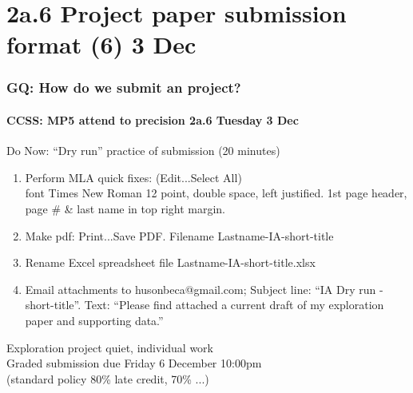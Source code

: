 \documentclass{beamer}
\begin{document}
\section{2a.6 Project paper submission format (6) 3 Dec}
\frame
{
  \frametitle{GQ: How do we submit an project?}
  \framesubtitle{CCSS: MP5 attend to precision \hfill \alert{2a.6 Tuesday 3 Dec}}
  \begin{block}{Do Now: ``Dry run'' practice of submission (20 minutes)}
    \begin{enumerate}
      \item Perform MLA quick fixes: (Edit...Select All) \\font Times New Roman 12 point, double space, left justified. 1st page header, page \# \& last name in top right margin.
      \item Make pdf: Print...Save PDF. Filename Lastname-IA-short-title
      \item Rename Excel spreadsheet file Lastname-IA-short-title.xlsx
      \item Email attachments to husonbeca@gmail.com; Subject line: ``IA Dry run - short-title''. Text: ``Please find attached a current draft of my exploration paper and supporting data.'' 
  \end{enumerate}
\end{block}

    Exploration project quiet, individual work\\[0.25cm]
    Graded submission \alert{due Friday 6 December 10:00pm} \\(standard policy 80\% late credit, 70\% ...)
}
\end{document}
